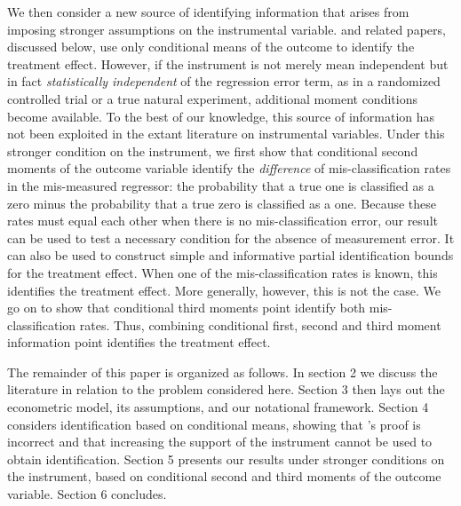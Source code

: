 We then consider a new source of identifying information that arises from imposing stronger assumptions on the instrumental variable.
\cite{Mahajan} and related papers, discussed below, use only conditional means of the outcome to identify the treatment effect.
However, if the instrument is not merely mean independent but in fact \emph{statistically independent} of the regression error term, as in a randomized controlled trial or a true natural experiment, additional moment conditions become available.
To the best of our knowledge, this source of information has not been exploited in the extant literature on instrumental variables.  
Under this stronger condition on the instrument, we first show that conditional second moments of the outcome variable identify the \emph{difference} of mis-classification rates in the mis-measured regressor: the probability that a true one is classified as a zero minus the probability that a true zero is classified as a one.
Because these rates must equal each other when there is no mis-classification error, our result can be used to test a necessary condition for the absence of measurement error.   
It can also be used to construct simple and informative partial identification bounds for the treatment effect.
When one of the mis-classification rates is known, this identifies the treatment effect.
More generally, however, this is not the case.
We go on to show that conditional third moments point identify both mis-classification rates.
Thus, combining conditional first, second and third moment information point identifies the treatment effect.

The remainder of this paper is organized as follows. 
In section 2 we discuss the literature in relation to the problem considered here. 
Section 3 then lays out the econometric model, its assumptions, and our notational framework. 
Section 4 considers identification based on conditional means, showing that \citeauthor{Mahajan}'s proof is incorrect and that increasing the support of the instrument cannot be used to obtain identification.
Section 5 presents our results under stronger conditions on the instrument, based on conditional second and third moments of the outcome variable.
Section 6 concludes.  

